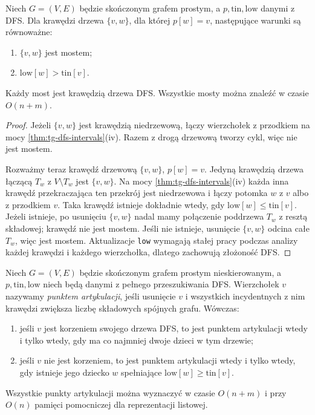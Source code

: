 \begin{twierdzenie}
\label{thm:tg-dfs-bridge}
Niech $G=(V,E)$ będzie skończonym grafem prostym,
a $p,\mathrm{tin},\mathrm{low}$ danymi z DFS.
Dla krawędzi drzewa $\{v,w\}$, dla której
$p[w]=v$, następujące warunki są równoważne:
\begin{enumerate}[label=(\roman*)]
\item $\{v,w\}$ jest mostem;
\item $\mathrm{low}[w]>\mathrm{tin}[v]$.
\end{enumerate}
Każdy most jest krawędzią drzewa DFS.
Wszystkie mosty można znaleźć w czasie $O(n+m)$.
\end{twierdzenie}
\begin{proof}
Jeżeli $\{v,w\}$ jest krawędzią niedrzewową,
łączy wierzchołek z przodkiem na mocy
\ref{thm:tg-dfs-intervals}(iv). Razem z drogą
drzewową tworzy cykl, więc nie jest mostem.

Rozważmy teraz krawędź drzewową $\{v,w\}$,
$p[w]=v$. Jedyną krawędzią drzewa łączącą
$T_w$ z $V\setminus T_w$ jest $\{v,w\}$.
Na mocy \ref{thm:tg-dfs-intervals}(iv)
każda inna krawędź przekraczająca ten przekrój
jest niedrzewowa i łączy potomka $w$
z $v$ albo z przodkiem $v$.
Taka krawędź istnieje dokładnie wtedy, gdy
$\mathrm{low}[w]\leq\mathrm{tin}[v]$.
Jeżeli istnieje, po usunięciu $\{v,w\}$
nadal mamy połączenie poddrzewa $T_w$
z resztą składowej; krawędź nie jest mostem.
Jeśli nie istnieje, usunięcie $\{v,w\}$
odcina całe $T_w$, więc jest mostem.
Aktualizacje \texttt{low} wymagają stałej
pracy podczas analizy każdej krawędzi
i każdego wierzchołka, dlatego zachowują
złożoność DFS.
\end{proof}

\begin{twierdzenie}
\label{thm:tg-dfs-articulation}
Niech $G=(V,E)$ będzie skończonym grafem prostym
nieskierowanym, a $p,\mathrm{tin},\mathrm{low}$
niech będą danymi z pełnego przeszukiwania DFS.
Wierzchołek $v$ nazywamy \emph{punktem artykulacji},
jeśli usunięcie $v$ i wszystkich incydentnych
z nim krawędzi zwiększa liczbę składowych spójnych
grafu. Wówczas:
\begin{enumerate}[label=(\roman*)]
\item jeśli $v$ jest korzeniem swojego drzewa DFS,
to jest punktem artykulacji wtedy i tylko wtedy,
gdy ma co najmniej dwoje dzieci w tym drzewie;
\item jeśli $v$ nie jest korzeniem, to jest punktem
artykulacji wtedy i tylko wtedy, gdy istnieje
jego dziecko $w$ spełniające
$\mathrm{low}[w]\geq\mathrm{tin}[v]$.
\end{enumerate}
Wszystkie punkty artykulacji można wyznaczyć
w czasie $O(n+m)$ i przy $O(n)$ pamięci
pomocniczej dla reprezentacji listowej.
\end{twierdzenie}

